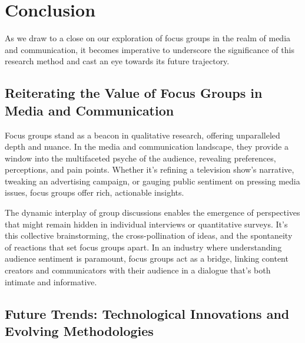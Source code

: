 \documentclass[
  b5paper]{book}
\begin{document}
\hypertarget{conclusion}{%
\section{Conclusion}\label{conclusion}}

As we draw to a close on our exploration of focus groups in the realm of media and communication, it becomes imperative to underscore the significance of this research method and cast an eye towards its future trajectory.

\hypertarget{reiterating-the-value-of-focus-groups-in-media-and-communication}{%
\subsection*{Reiterating the Value of Focus Groups in Media and Communication}\label{reiterating-the-value-of-focus-groups-in-media-and-communication}}

Focus groups stand as a beacon in qualitative research, offering unparalleled depth and nuance. In the media and communication landscape, they provide a window into the multifaceted psyche of the audience, revealing preferences, perceptions, and pain points. Whether it's refining a television show's narrative, tweaking an advertising campaign, or gauging public sentiment on pressing media issues, focus groups offer rich, actionable insights.

The dynamic interplay of group discussions enables the emergence of perspectives that might remain hidden in individual interviews or quantitative surveys. It's this collective brainstorming, the cross-pollination of ideas, and the spontaneity of reactions that set focus groups apart. In an industry where understanding audience sentiment is paramount, focus groups act as a bridge, linking content creators and communicators with their audience in a dialogue that's both intimate and informative.

\hypertarget{future-trends-technological-innovations-and-evolving-methodologies}{%
\subsection*{Future Trends: Technological Innovations and Evolving Methodologies}\label{future-trends-technological-innovations-and-evolving-methodologies}}
\end{document}
